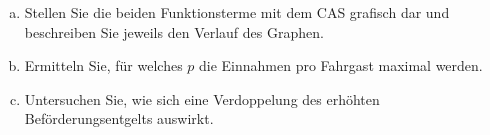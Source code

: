 \begin{exercise}
\begin{enumerate}[1)]
\begin{enumerate}[a)]
              \item Stellen Sie die beiden Funktionsterme mit dem CAS grafisch
                    dar und beschreiben Sie jeweils den Verlauf des Graphen.
              \item Ermitteln Sie, für welches $p$ die Einnahmen pro Fahrgast
                    maximal werden.
              \item Untersuchen Sie, wie sich eine Verdoppelung des
                    \glqq erhöhten Beförderungsentgelts\grqq{} auswirkt.
            \end{enumerate}
    \end{enumerate}
  \fi
\end{exercise}
